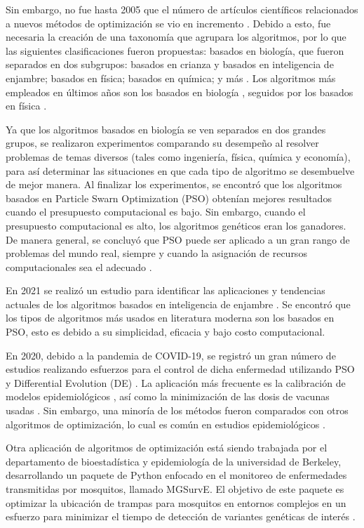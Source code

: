 \documentclass[letterpaper, 10pt, conference]{ieeeconf}
\begin{document}
  Sin embargo, no fue hasta 2005 que el número de artículos científicos
  relacionados a nuevos métodos de optimización se vio en incremento
  \cite{Taxonomies}.
  Debido a esto, fue necesaria la creación de una taxonomía que agrupara los
  algoritmos, por lo que las siguientes clasificaciones fueron propuestas:
  basados en biología, que fueron separados en dos subgrupos: basados en
  crianza y basados en inteligencia de enjambre; basados en física; basados en
  química; y más \cite{Taxonomies}.
  Los algoritmos más empleados en últimos años son los basados en biología
  \cite{Taxonomies}, seguidos por los basados en física \cite{PhysicsBasedRev}.

  Ya que los algoritmos basados en biología se ven separados en dos grandes
  grupos, se realizaron experimentos comparando su desempeño al resolver
  problemas de temas diversos (tales como ingeniería, física, química y
  economía), para así determinar las situaciones en que cada tipo de algoritmo
  se desembuelve de mejor manera.
  Al finalizar los experimentos, se encontró que los algoritmos basados en
  Particle Swarn Optimization (PSO) obtenían mejores resultados cuando el
  presupuesto computacional es bajo. Sin embargo, cuando el presupuesto
  computacional es alto, los algoritmos genéticos eran los ganadores.
  De manera general, se concluyó que PSO puede ser aplicado a un gran rango de
  problemas del mundo real, siempre y cuando la asignación de recursos
  computacionales sea el adecuado \cite{SwarmVsEvol}.

  En 2021 se realizó un estudio para identificar las aplicaciones y tendencias
  actuales de los algoritmos basados en inteligencia de enjambre
  \cite{SwarmIntRev}.
  Se encontró que los tipos de algoritmos más usados en literatura moderna son
  los basados en PSO, esto es debido a su simplicidad, eficacia y bajo costo
  computacional.

  En  2020, debido a la pandemia de COVID-19, se registró un gran número de
  estudios realizando esfuerzos para el control de dicha enfermedad utilizando
  PSO y Differential Evolution (DE) \cite{DE&PSOCov}.
  La aplicación más frecuente es la calibración de modelos epidemiológicos
  \cite{DE&PSOCov}, así como la minimización de las dosis de vacunas usadas
  \cite{COVVacc}.
  Sin embargo, una minoría de los métodos fueron comparados con otros
  algoritmos de optimización, lo cual es común en estudios epidemiológicos
  \cite{DE&PSOCov}.

  Otra aplicación de algoritmos de optimización está siendo trabajada por el
  departamento de bioestadística y epidemiología de la universidad de Berkeley,
  desarrollando un paquete de Python enfocado en el monitoreo de enfermedades
  transmitidas por mosquitos, llamado MGSurvE.
  El objetivo de este paquete es optimizar la ubicación de trampas para
  mosquitos en entornos complejos en un esfuerzo para minimizar el tiempo de
  detección de variantes genéticas de interés \cite{MGSurvEPyPi}.
\end{document}
